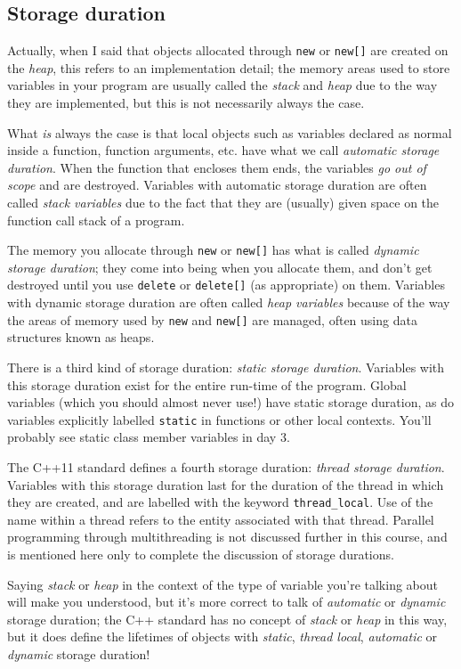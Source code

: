 \documentclass[a4paper]{scrartcl}
\begin{document}
\subsection{Storage duration}
Actually, when I said that objects allocated through \verb|new| or \verb|new[]| are created on the \emph{heap}, this refers to an implementation detail; the memory areas used to store variables in your program are usually called the \emph{stack} and \emph{heap} due to the way they are implemented, but this is not necessarily always the case.

What \emph{is} always the case is that local objects such as variables declared as normal inside a function, function arguments, etc. have what we call \emph{automatic storage duration}. When the function that encloses them ends, the variables \emph{go out of scope} and are destroyed. Variables with automatic storage duration are often called \emph{stack variables} due to the fact that they are (usually) given space on the function call stack of a program.

The memory you allocate through \verb|new| or \verb|new[]| has what is called \emph{dynamic storage duration}; they come into being when you allocate them, and don't get destroyed until you use \verb|delete| or \verb|delete[]| (as appropriate) on them. Variables with dynamic storage duration are often called \emph{heap variables} because of the way the areas of memory used by \verb|new| and \verb|new[]| are managed, often using data structures known as heaps.

There is a third kind of storage duration: \emph{static storage duration}. Variables with this storage duration exist for the entire run-time of the program. Global variables (which you should almost never use!) have static storage duration, as do variables explicitly labelled \verb|static| in functions or other local contexts. You'll probably see static class member variables in day 3.

The C++11 standard defines a fourth storage duration: \emph{thread storage duration}. Variables with this storage duration last for the duration of the thread in which they are created, and are labelled with the keyword \verb|thread_local|. Use of the name within a thread refers to the entity associated with that thread. Parallel programming through multithreading is not discussed further in this course, and is mentioned here only to complete the discussion of storage durations.

Saying \emph{stack} or \emph{heap} in the context of the type of variable you're talking about will make you understood, but it's more correct to talk of \emph{automatic} or \emph{dynamic} storage duration; the C++ standard has no concept of \emph{stack} or \emph{heap} in this way, but it does define the lifetimes of objects with \emph{static}, \emph{thread local}, \emph{automatic} or \emph{dynamic} storage duration!
\end{document}
